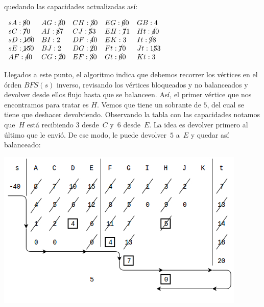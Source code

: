 \documentclass[10pt,a4paper]{article}
\begin{document}
quedando las capacidades actualizadas así:

\begin{center}
$\begin{array}{lllll} sA:\cancel{8} 0 & AG: \cancel{3}0 & CH: \cancel{3}0 & EG: \cancel{6}0 & GB:4\\ sC:\cancel{7 } 0 & AI: \cancel{8}7 & CJ: \cancel{5}3 & EH: \cancel{7}1 & Ht: \cancel{4}0\\ sD:\cancel{10} 0 & BI: 2 & DF:\cancel{4}0 & EK: 3 & It: \cancel{9}8\\ sE: \cancel{15} 0 &BJ: 2 & DG: \cancel{2}0 & Ft: \cancel{7}0 & Jt: 1\cancel{5}3\\ AF: \cancel{4}0 & CG: \cancel{2}0 & EF: \cancel{3}0 & Gt: \cancel{6}0 & Kt: 3\\ \end{array}$
\end{center}

Llegados a este punto, el algoritmo indica que debemos recorrer los vértices en el órden $BFS(s)$ inverso, revisando los vértices bloqueados y no balanceados y devolver desde ellos flujo hasta que se balanceen. Así, el primer vértice que nos encontramos para tratar es $H$. Vemos que tiene un sobrante de $5$, del cual se tiene que deshacer devolviendo. Observando la tabla con las capacidades notamos que $H$ está recibiendo $3$ desde $C$ y $6$ desde $E$. La idea es devolver primero al último que le envió. De ese modo, le puede devolver $5$ a $E$ y quedar así balanceado:

\begin{center}

    \begin{adjustbox}{max size={\textwidth}{\textheight}}
        \includegraphics{definitions/wave_b6.jpg}
        \end{adjustbox}
    
\end{center}
\end{document}
